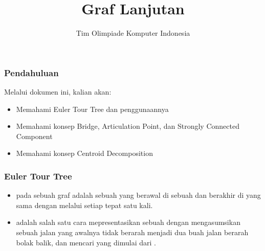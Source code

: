 

\title{Graf Lanjutan}
\author{Tim Olimpiade Komputer Indonesia}
\date{}

\usepackage{tikz} 



\begin{frame}
\titlepage
\end{frame}

\begin{frame}
\frametitle{Pendahuluan}
Melalui dokumen ini, kalian akan:
\begin{itemize}
  \item Memahami Euler Tour Tree dan penggunaannya
  \item Memahami konsep Bridge, Articulation Point, dan Strongly Connected Component
  \item Memahami konsep Centroid Decomposition
\end{itemize}
\end{frame}

\begin{frame}
\frametitle{Euler Tour Tree}
\begin{itemize}
  \item {} pada sebuah graf adalah sebuah \ftrail yang berawal di sebuah \fnode dan berakhir di \fnode yang sama dengan melalui setiap \fedge tepat satu kali.
  \item {} adalah salah satu cara mepresentasikan sebuah \ftree dengan mengasumsikan sebuah jalan yang awalnya tidak berarah menjadi dua buah jalan berarah bolak balik, dan mencari \feulerTour yang dimulai dari \froot.
\end{itemize}
\begin{figure}[!h]
\centering
\end{figure}
\end{frame}

